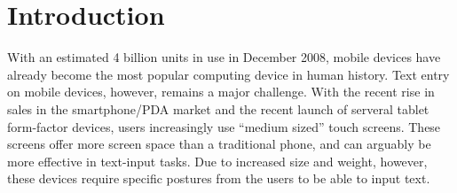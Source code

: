 \section{Introduction}

With an estimated 4 billion units in use in December 2008, mobile
devices have already become the most popular computing device in human
history. Text entry on mobile devices, however, remains a major
challenge. With the recent rise in sales in the smartphone/PDA market
and the recent launch of serveral tablet form-factor devices, users
increasingly use ``medium sized'' touch screens. These screens offer
more screen space than a traditional phone, and can arguably be more
effective in text-input tasks. Due to increased size and weight,
however, these devices require specific postures from the users to be
able to input text.

